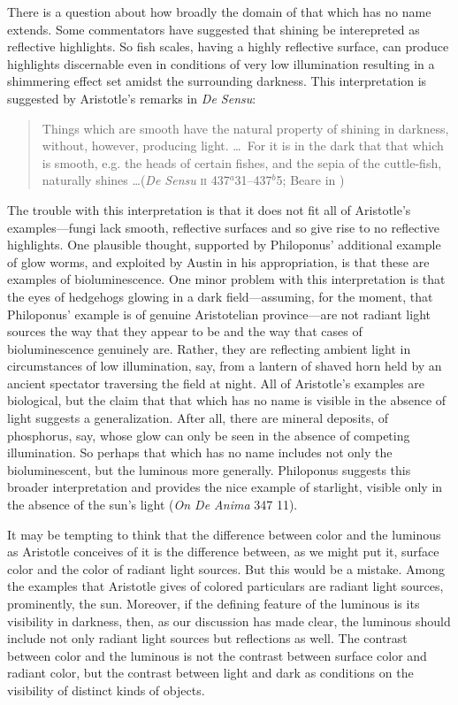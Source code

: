 There is a question about how broadly the domain of that which has no name extends. Some commentators have suggested that shining be interepreted as reflective highlights. So fish scales, having a highly reflective surface, can produce highlights discernable even in conditions of very low illumination resulting in a shimmering effect set amidst the surrounding darkness. This interpretation is suggested by Aristotle's remarks in \emph{De Sensu}: 
\begin{quote}
	Things which are smooth have the natural property of shining in darkness, without, however, producing light. \ldots\ For it is in the dark that that which is smooth, e.g. the heads of certain fishes, and the sepia of the cuttle-fish, naturally shines \ldots (\emph{De Sensu} \textsc{ii} 437\( ^{a} \)31--437\( ^{b} \)5; Beare in \citealt[4]{Barnes:1984uq})
\end{quote}
The trouble with this interpretation is that it does not fit all of Aristotle's examples---fungi lack smooth, reflective surfaces and so give rise to no reflective highlights. One plausible thought, supported by Philoponus' additional example of glow worms, and exploited by Austin in his appropriation, is that these are examples of bioluminescence. One minor problem with this interpretation is that the eyes of hedgehogs glowing in a dark field---assuming, for the moment, that Philoponus' example is of genuine Aristotelian province---are not radiant light sources the way that they appear to be and the way that cases of  bioluminescence genuinely are. Rather, they are reflecting ambient light in circumstances of low illumination, say, from a lantern of shaved horn held by an ancient spectator traversing the field at night. All of Aristotle's examples are biological, but the claim that that which has no name is visible in the absence of light suggests a generalization. After all, there are mineral deposits, of phosphorus, say, whose glow can only be seen in the absence of competing illumination. So perhaps that which has no name includes not only the bioluminescent, but the luminous more generally. Philoponus suggests this broader interpretation and provides the nice example of starlight, visible only in the absence of the sun's light (\emph{On \emph{De Anima}} 347 11). 

It may be tempting to think that the difference between color and the luminous as Aristotle conceives of it is the difference between, as we might put it, surface color and the color of radiant light sources. But this would be a mistake. Among the examples that Aristotle gives of colored particulars are radiant light sources, prominently, the sun. Moreover, if the defining feature of the luminous is its visibility in darkness, then, as our discussion has made clear, the luminous should include not only radiant light sources but reflections as well. The contrast between color and the luminous is not the contrast between surface color and radiant color, but the contrast between light and dark as conditions on the visibility of distinct kinds of objects.

